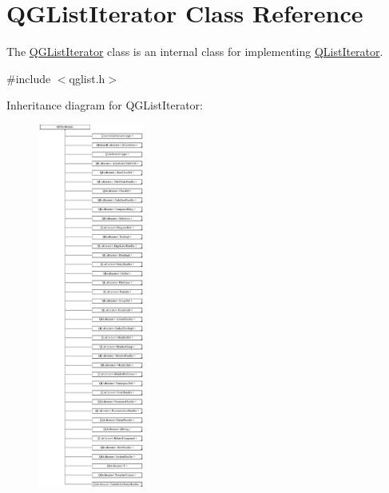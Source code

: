 \hypertarget{class_q_g_list_iterator}{}\section{Q\+G\+List\+Iterator Class Reference}
\label{class_q_g_list_iterator}


The \mbox{\hyperlink{class_q_g_list_iterator}{Q\+G\+List\+Iterator}} class is an internal class for implementing \mbox{\hyperlink{class_q_list_iterator}{Q\+List\+Iterator}}.  




{\ttfamily \#include $<$qglist.\+h$>$}

Inheritance diagram for Q\+G\+List\+Iterator\+:\begin{figure}[H]
\begin{center}
\leavevmode
\includegraphics[height=12.000000cm]{class_q_g_list_iterator}
\end{center}
\end{figure}

